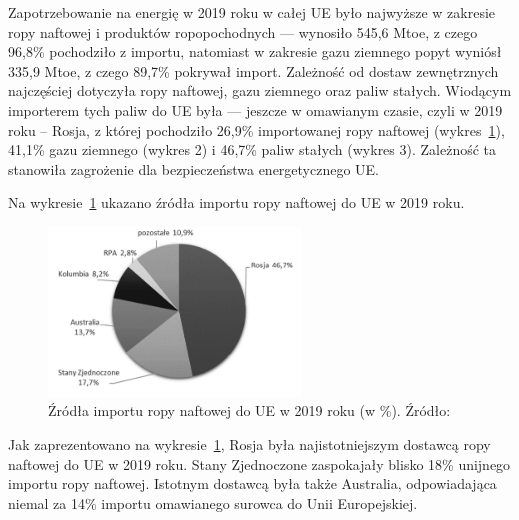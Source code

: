 \documentclass[polish, twoside, 12pt, a4paper]{article}
\theoremstyle{definition}
\theoremstyle{plain}
\theoremstyle{remark}
\begin{document}
Zapotrzebowanie na energię w 2019 roku w całej UE było najwyższe w zakresie ropy naftowej i produktów ropopochodnych --- wynosiło 545,6 Mtoe, z czego 96,8\% pochodziło z importu, natomiast w zakresie gazu ziemnego popyt wyniósł 335,9 Mtoe, z czego 89,7\% pokrywał import. Zależność od dostaw zewnętrznych najczęściej dotyczyła ropy naftowej, gazu ziemnego oraz paliw stałych. Wiodącym importerem tych paliw do UE była --- jeszcze w omawianym czasie, czyli w 2019 roku – Rosja, z której pochodziło 26,9\% importowanej ropy naftowej (wykres~\ref{fig:x1}), 41,1\% gazu ziemnego (wykres 2) i 46,7\% paliw stałych (wykres 3). Zależność ta stanowiła zagrożenie dla bezpieczeństwa energetycznego UE. 

Na wykresie~\ref{fig:x1} ukazano źródła importu ropy naftowej do UE w 2019 roku.

\begin{figure}[hbt]
  \centering
  \includegraphics[width=0.6\textwidth]{./out_figures/figure_1}
  
    \captionsetup{margin=10pt,font=small,labelfont=bf,width=.8\textwidth}
    
  \caption[Źródła importu ropy naftowej do UE w 2019 roku (w \%)]{Źródła importu ropy naftowej do UE w 2019 roku (w \%). Źródło: \cite{pangsykania2022}}
  \label{fig:x1}
\end{figure}

Jak zaprezentowano na wykresie~\ref{fig:x1}, Rosja była najistotniejszym dostawcą ropy naftowej do UE w 2019 roku. Stany Zjednoczone zaspokajały blisko 18\% unijnego importu ropy naftowej. Istotnym dostawcą była także Australia, odpowiadająca niemal za 14\% importu omawianego surowca do Unii Europejskiej.
\end{document}
